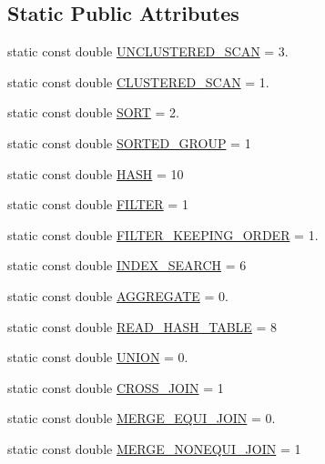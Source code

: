\subsection*{Static Public Attributes}
\begin{DoxyCompactItemize}
\item 
static const double \hyperlink{classrafe_1_1_time_complexity_a7fbcf1745878b423e54d5d42efe13154}{U\+N\+C\+L\+U\+S\+T\+E\+R\+E\+D\+\_\+\+S\+C\+A\+N} = 3.
\item 
static const double \hyperlink{classrafe_1_1_time_complexity_a9801e942ee0c40046ceb756c07dc92cc}{C\+L\+U\+S\+T\+E\+R\+E\+D\+\_\+\+S\+C\+A\+N} = 1.
\item 
static const double \hyperlink{classrafe_1_1_time_complexity_a4400cd269924110e53d97b3e074de846}{S\+O\+R\+T} = 2.
\item 
static const double \hyperlink{classrafe_1_1_time_complexity_a0a177ac807f6258a6e2b53e0fb86a482}{S\+O\+R\+T\+E\+D\+\_\+\+G\+R\+O\+U\+P} = 1
\item 
static const double \hyperlink{classrafe_1_1_time_complexity_acc03b3c0cae3944fbb8d93db0c668eea}{H\+A\+S\+H} = 10
\item 
static const double \hyperlink{classrafe_1_1_time_complexity_aa0625dabba1b84acbfd3bccb292e4ff6}{F\+I\+L\+T\+E\+R} = 1
\item 
static const double \hyperlink{classrafe_1_1_time_complexity_a0e8e454747c5a1bacc5f0d0753c54819}{F\+I\+L\+T\+E\+R\+\_\+\+K\+E\+E\+P\+I\+N\+G\+\_\+\+O\+R\+D\+E\+R} = 1.
\item 
static const double \hyperlink{classrafe_1_1_time_complexity_aa0e26e3055e00e90b601428b0ad74e7e}{I\+N\+D\+E\+X\+\_\+\+S\+E\+A\+R\+C\+H} = 6
\item 
static const double \hyperlink{classrafe_1_1_time_complexity_a4a637f321994988a43c70987319deeb0}{A\+G\+G\+R\+E\+G\+A\+T\+E} = 0.
\item 
static const double \hyperlink{classrafe_1_1_time_complexity_a61e08b141c8e61b50a980efc48d05cc2}{R\+E\+A\+D\+\_\+\+H\+A\+S\+H\+\_\+\+T\+A\+B\+L\+E} = 8
\item 
static const double \hyperlink{classrafe_1_1_time_complexity_a80c58870ea145943f70db0d09375efda}{U\+N\+I\+O\+N} = 0.
\item 
static const double \hyperlink{classrafe_1_1_time_complexity_af640f31f8fa80c928f0a1cd6c819443c}{C\+R\+O\+S\+S\+\_\+\+J\+O\+I\+N} = 1
\item 
static const double \hyperlink{classrafe_1_1_time_complexity_a68dde40140a8dfc63a2b74308c6884cd}{M\+E\+R\+G\+E\+\_\+\+E\+Q\+U\+I\+\_\+\+J\+O\+I\+N} = 0.
\item 
static const double \hyperlink{classrafe_1_1_time_complexity_aed73c88d72629bb341ed639edf5e255b}{M\+E\+R\+G\+E\+\_\+\+N\+O\+N\+E\+Q\+U\+I\+\_\+\+J\+O\+I\+N} = 1
\end{DoxyCompactItemize}


